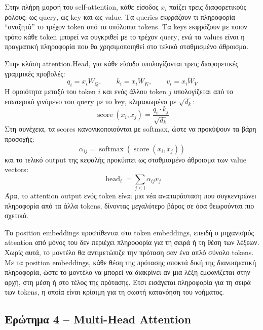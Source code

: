 \documentclass[11pt,a4paper]{article}
\begin{document}
Στην πλήρη μορφή του \textlatin{self-attention}, κάθε είσοδος $x_i$ παίζει τρεις διαφορετικούς ρόλους: ως \textlatin{query}, ως \textlatin{key} και 
ως \textlatin{value}. Τα \textlatin{queries} εκφράζουν τι πληροφορία ``αναζητά'' το τρέχον \textlatin{token} από τα υπόλοιπα \textlatin{tokens}. 
Τα \textlatin{keys} εκφράζουν με ποιον τρόπο κάθε \textlatin{token} μπορεί να συγκριθεί με το τρέχον \textlatin{query}, ενώ τα \textlatin{values} 
είναι η πραγματική πληροφορία που θα χρησιμοποιηθεί στο τελικό σταθμισμένο άθροισμα.

Στην κλάση \textlatin{attention.Head}, για κάθε είσοδο υπολογίζονται τρεις διαφορετικές γραμμικές προβολές:
\[
q_i = x_i W_Q,\qquad k_i = x_i W_K,\qquad v_i = x_i W_V
\]
Η ομοιότητα μεταξύ του \textlatin{token} $i$ και ενός άλλου \textlatin{token} $j$ υπολογίζεται από το εσωτερικό γινόμενο του \textlatin{query} με 
το \textlatin{key}, κλιμακωμένο με $\sqrt{d_k}$:
\[
\operatorname{score}(x_i, x_j) = \frac{q_i \cdot k_j}{\sqrt{d_k}}
\]
Στη συνέχεια, τα \textlatin{scores} κανονικοποιούνται με \textlatin{softmax}, ώστε να προκύψουν τα βάρη προσοχής:
\[
\alpha_{ij} = \operatorname{softmax}(\operatorname{score}(x_i, x_j))
\]
και το τελικό \textlatin{output} της κεφαλής προκύπτει ως σταθμισμένο άθροισμα των \textlatin{value vectors}:
\[
\operatorname{head}_i = \sum_{j \leq i} \alpha_{ij} v_j
\]
Άρα, το \textlatin{attention output} ενός \textlatin{token} είναι μια νέα αναπαράσταση που συγκεντρώνει πληροφορία από τα άλλα \textlatin{tokens}, 
δίνοντας μεγαλύτερο βάρος σε όσα θεωρούνται πιο σχετικά.

Τα \textlatin{position embeddings} προστίθενται στα \textlatin{token embeddings}, επειδή ο μηχανισμός \textlatin{attention} από μόνος του 
δεν περιέχει πληροφορία για τη σειρά ή τη θέση των λέξεων. Χωρίς αυτά, το μοντέλο θα αντιμετώπιζε την πρόταση σαν ένα απλό σύνολο \textlatin{tokens}. 
Με τα \textlatin{position embeddings}, κάθε θέση της πρότασης αποκτά δική της διανυσματική πληροφορία, ώστε το μοντέλο να μπορεί να διακρίνει 
αν μια λέξη εμφανίζεται στην αρχή, στη μέση ή στο τέλος της πρότασης. Έτσι εισάγεται πληροφορία για τη σειρά των \textlatin{tokens}, η οποία 
είναι κρίσιμη για τη σωστή κατανόηση του νοήματος.

\subsection*{Ερώτημα 4 -- \textlatin{Multi-Head Attention}}
\end{document}

